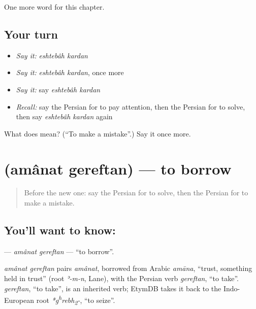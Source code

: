 \begin{grammarlens}[title={What you've built}]
One more word for this chapter.
\end{grammarlens}

\subsection*{Your turn}
\begin{itemize}
\raggedright
  \item \emph{Say it:} \emph{eshtebâh kardan}
  \item \emph{Say it:} \emph{eshtebâh kardan}, once more
  \item \emph{Say it:} say \emph{eshtebâh kardan}
  \item \emph{Recall:} say the Persian for to pay attention, then the Persian for to solve, then say \emph{eshtebâh kardan} again
\end{itemize}

\begin{tcolorbox}[breakable,colback=teal!4,colframe=teal!35!black,title={Before you move on}]
What does   mean? (\textquotedblleft{}To make a mistake\textquotedblright{}.) Say it once more.
\end{tcolorbox}
\section[\texorpdfstring{\fa{امانت} \fa{گرفتن} (amânat gereftan)}{امانت گرفتن (amânat gereftan)}]{  (amânat gereftan) — to borrow}

\label{lesson:FA-C185-amanat-gereftan}



\begin{quote}
Before the new one: say the Persian for to solve, then the Persian for to make a mistake.
\end{quote}

\subsection*{You'll want to know:  }
\textbf{ } — \emph{amânat gereftan} — \textquotedblleft{}to borrow\textquotedblright{}.

\begin{cousinweb}
\emph{amânat gereftan} pairs \emph{amânat}, borrowed from Arabic \emph{amāna}, \textquotedblleft{}trust, something held in trust\textquotedblright{} (root \emph{ʾ-m-n}, Lane), with the Persian verb \emph{gereftan}, \textquotedblleft{}to take\textquotedblright{}. \emph{gereftan}, \textquotedblleft{}to take\textquotedblright{}, is an inherited verb; EtymDB takes it back to the Indo-European root \emph{*g\textsuperscript{h}rebh\textsubscript{2}-}, \textquotedblleft{}to seize\textquotedblright{}.
\end{cousinweb}

